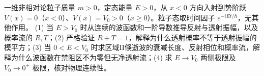 一维非相对论粒子质量 \(m>0\)，定态能量 \(E>0\)，从 \(x<0\) 方向入射到势阶跃 \(V(x)=0\)（\(x<0\)）、\(V(x)=V_0>0\)（\(x\ge0\)）。粒子态取时间因子 \(e^{-iEt/\hbar}\)，无其他作用。
(1) 当 \(E>V_0\) 时从连续的波函数和一阶导数推导反射与透射振幅，以及概率流的 \(R,T\)；(2) 严格验证 \(R+T=1\)，解释为什么透射概率不等于透射振幅的模平方；(3) 当 \(0<E<V_0\) 时求区域II倏逝波的衰减长度、反射相位和概率流，解释为什么波函数在禁阻区不为零但无净透射流；(4) 求 \(E\to V_0\) 两侧极限及 \(V_0\to0^+\) 极限，核对物理连续性。
